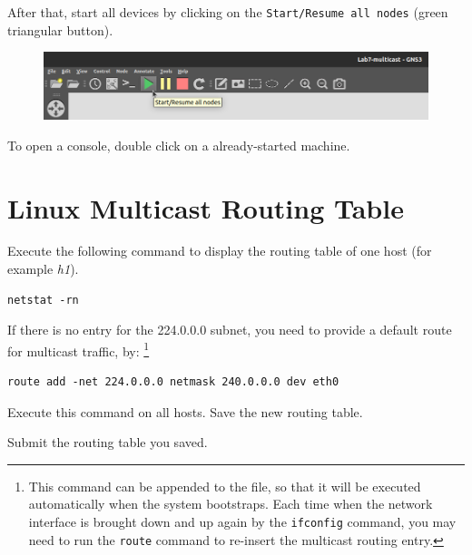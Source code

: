 \documentclass{../UTNetLab}
\begin{document}
    After that, start all devices by clicking on the \texttt{Start/Resume all nodes} (green triangular button).
    \begin{figure}[H]
        \centering
        \includegraphics[scale=1.6]{img/start-all}
    \end{figure}

    To open a console, double click on a already-started machine.


\section{Linux Multicast Routing Table\label{sec:rt}}
\label{sec:linux-multicast-routing}
    Execute the following command to display the routing table of one host (for example \textit{h1}).
    \begin{lstlisting}
netstat -rn
    \end{lstlisting}
    
    If there is no entry for the 224.0.0.0 subnet, you need to provide a default route for multicast traffic, by:
    \footnote{This command can be appended to the  file, so that it will be executed automatically when the system bootstraps. Each time when the network interface is brought down and up again by the \lstinline{ifconfig} command, you may need to run the \lstinline{route} command to re-insert the multicast routing entry.}
    \begin{lstlisting}[emph=eth0]
route add -net 224.0.0.0 netmask 240.0.0.0 dev eth0
    \end{lstlisting}
    
    Execute this command on all hosts.
    Save the new routing table.
    
    \begin{report}
    \item Submit the routing table you saved.
    \end{report}
\end{document}
